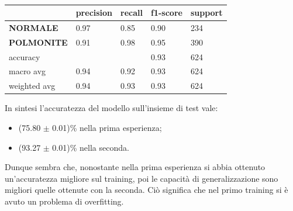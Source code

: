   

\begin{table}[hb!]
  \begin{tabular}{@{}l|llll@{}}
  \toprule
                     & \textbf{precision} & \textbf{recall} & \textbf{f1-score} & \textbf{support} \\ \midrule
  \textbf{NORMALE}   & 0.97               & 0.85            & 0.90              & 234              \\
  \textbf{POLMONITE} & 0.91               & 0.98            & 0.95              & 390              \\ \midrule
  accuracy           &                    &                 & 0.93              & 624              \\
  macro avg          & 0.94               & 0.92            & 0.93              & 624              \\
  weighted avg       & 0.94               & 0.93            & 0.93              & 624              \\ \bottomrule
  \end{tabular}
  \caption{}
\end{table}

In sintesi l'accuratezza del modello sull'insieme di test vale:
\begin{itemize}
  \item  (75.80 $\pm$ 0.01)\% nella prima esperienza;
  \item  (93.27 $\pm$ 0.01)\% nella seconda.
\end{itemize}
Dunque sembra che, nonostante nella prima esperienza si abbia ottenuto un'accuratezza migliore sul training, 
poi le capacità di generalizzazione sono migliori quelle ottenute con la seconda.
 Ciò significa che nel primo training si è avuto un problema di overfitting. 


